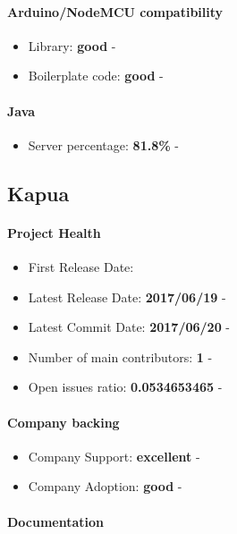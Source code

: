\documentclass{article}
\begin{document}
\paragraph{Arduino/NodeMCU compatibility}

\begin{itemize}
\item Library: \textbf{good} - 
\item Boilerplate code: \textbf{good} - 
\end{itemize}

\paragraph{Java} 

\begin{itemize}
\item Server percentage: \textbf{81.8\%} - 
\end{itemize}

\subsection{Kapua}

\paragraph{Project Health}

\begin{itemize}
\item First Release Date: 
\item Latest Release Date: \textbf{2017/06/19} - 
\item Latest Commit Date: \textbf{2017/06/20} - 
\item Number of main contributors: \textbf{1} - 
\item Open issues ratio: \textbf{0.0534653465} - 
\end{itemize}

\paragraph{Company backing}

\begin{itemize}
\item Company Support: \textbf{excellent} - 
\item Company Adoption: \textbf{good} - 
\end{itemize}

\paragraph{Documentation}
\end{document}

